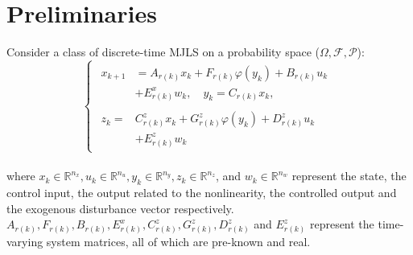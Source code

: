 \documentclass[conference]{IEEEtran}
\begin{document}
\section{Preliminaries}
Consider a class of discrete-time MJLS on a probability space ($\varOmega,\mathcal{F},\mathcal{P}$):
\begin{equation}\label{syseq}
	\left\{
	\begin{array}{lr}
		\begin{split}
			x_{k+1}&=A_{r(k)}x_k+F_{r(k)}\varphi(y_k)+B_{r(k)}u_k\\
			&+E^x_{r(k)}w_k, \quad y_k=C_{r(k)}x_k,
		\end{split}
		\\
		\begin{split}
			z_k= & C^z_{r(k)}x_k+G^z_{r(k)}\varphi(y_k)+D^z_{r(k)}u_k\\
				&+E^z_{r(k)}w_k
		\end{split}
		
	\end{array}
	\right.
\end{equation}\\
where $x_k\in\mathbb{R}^{n_x}, u_k\in\mathbb{R}^{n_u}, y_k\in\mathbb{R}^{n_y}, z_k\in\mathbb{R}^{n_z}$, and $w_k\in\mathbb{R}^{n_w}$ represent the state, the control input, the output related to the nonlinearity, the controlled output and the exogenous disturbance vector respectively. $A_{r(k)}, F_{r(k)}, B_{r(k)}, E^x_{r(k)}, C^z_{r(k)}, G^z_{r(k)}, D^z_{r(k)}$ and $E^z_{r(k)}$ represent the time-varying system matrices, all of which are pre-known and real.  
\end{document}
